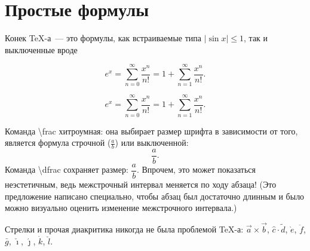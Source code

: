 \documentclass[12pt]{article}
\begin{document}
\section{Простые формулы}

Конек \TeX-а~--- это формулы, как встраиваемые
типа $|\sin x| \leqslant 1$, так и выключенные вроде

$$
    e^x = \sum_{n = 0}^\infty \frac{x^n}{n!}
        = 1 + \sum_{n = 1}^\infty \frac{x^n}{n!}.
$$


\[
    e^x = \sum_{n = 0}^\infty \frac{x^n}{n!}
        = 1 + \sum_{n = 1}^\infty \frac{x^n}{n!}.
\]



Команда \textbackslash frac хитроумная:
она выбирает размер шрифта в зависимости от того,
является формула строчной ($\frac{a}{b}$) или выключенной:
$$\frac{a}{b}.$$ Команда \textbackslash dfrac сохраняет размер:
$\dfrac{a}{b}$. Впрочем, это может показаться неэстетичным,
ведь межстрочный интервал меняется по ходу абзаца!
(Это предложение написано специально, чтобы абзац был достаточно длинным
и было можно визуально оценить изменение межстрочного интервала.)

Стрелки и прочая диакритика никогда не была проблемой
\TeX-а: $\vec a \times \vec b$, $\hat c \cdot \tilde d$,
$\grave e$, $\ddot f$, $\bar g$, $\check \imath$, $\acute \jmath$,
$\dot k$, $\breve l$.
\end{document}
